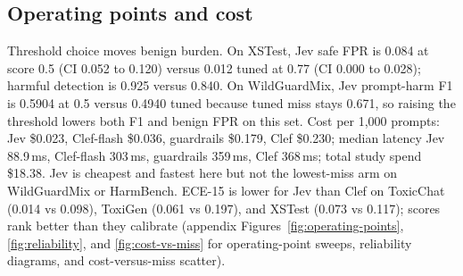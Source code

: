 \subsection{Operating points and cost}
\label{sec:results-cost}

Threshold choice moves benign burden.
On XSTest, Jev safe FPR is 0.084 at score 0.5 (CI 0.052 to 0.120) versus 0.012 tuned at 0.77 (CI 0.000 to 0.028); harmful detection is 0.925 versus 0.840.
On WildGuardMix, Jev prompt-harm F1 is 0.5904 at 0.5 versus 0.4940 tuned because tuned miss stays 0.671, so raising the threshold lowers both F1 and benign FPR on this set.
Cost per 1{,}000 prompts: Jev \$0.023, Clef-flash \$0.036, guardrails \$0.179, Clef \$0.230; median latency Jev 88.9\,ms, Clef-flash 303\,ms, guardrails 359\,ms, Clef 368\,ms; total study spend \$18.38.
Jev is cheapest and fastest here but not the lowest-miss arm on WildGuardMix or HarmBench.
ECE-15 is lower for Jev than Clef on ToxicChat (0.014 vs 0.098), ToxiGen (0.061 vs 0.197), and XSTest (0.073 vs 0.117); scores rank better than they calibrate (appendix Figures~\ref{fig:operating-points}, \ref{fig:reliability}, and \ref{fig:cost-vs-miss} for operating-point sweeps, reliability diagrams, and cost-versus-miss scatter).
